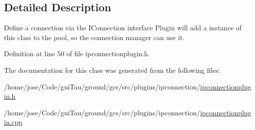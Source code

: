\subsection{Detailed Description}
Define a connection via the I\-Connection interface Plugin will add a instance of this class to the pool, so the connection manager can use it. 

Definition at line 50 of file ipconnectionplugin.\-h.



The documentation for this class was generated from the following files\-:\begin{DoxyCompactItemize}
\item 
/home/jose/\-Code/gui\-Tau/ground/gcs/src/plugins/ipconnection/\hyperlink{ipconnectionplugin_8h}{ipconnectionplugin.\-h}\item 
/home/jose/\-Code/gui\-Tau/ground/gcs/src/plugins/ipconnection/\hyperlink{ipconnectionplugin_8cpp}{ipconnectionplugin.\-cpp}\end{DoxyCompactItemize}
